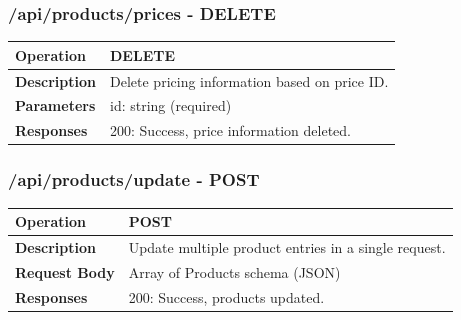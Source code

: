 \subsubsection*{/api/products/prices - DELETE}
\begin{tabular}{|>{\raggedright\arraybackslash}p{3cm}|p{12cm}|}
\hline
\textbf{Operation} & DELETE \\
\hline
\textbf{Description} & Delete pricing information based on price ID. \\
\hline
\textbf{Parameters} & id: string (required) \\
\hline
\textbf{Responses} & 200: Success, price information deleted. \\
\hline
\end{tabular}

\subsubsection*{/api/products/update - POST}
\begin{tabular}{|>{\raggedright\arraybackslash}p{3cm}|p{12cm}|}
\hline
\textbf{Operation} & POST \\
\hline
\textbf{Description} & Update multiple product entries in a single request. \\
\hline
\textbf{Request Body} & Array of Products schema (JSON) \\
\hline
\textbf{Responses} & 200: Success, products updated. \\
\hline
\end{tabular}



